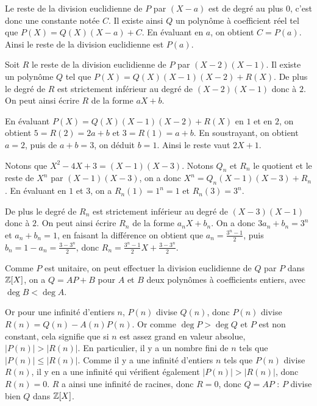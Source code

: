 \begin{sol}
Le reste de la division euclidienne de $P$ par $(X - a)$ est de degré au plus $0$, c'est donc une constante notée $C$. Il existe ainsi $Q$ un polynôme à coefficient réel tel que $P(X) = Q(X)(X - a) + C$. En évaluant en $a$, on obtient $C = P(a)$. Ainsi le reste de la division euclidienne est $P(a)$.
\end{sol}


\begin{sol}
Soit $R$ le reste de la division euclidienne de $P$ par $(X - 2)(X - 1)$. Il existe un polynôme $Q$ tel que $P(X) = Q(X)(X - 1)(X - 2) + R(X)$. De plus le degré de $R$ est strictement inférieur au degré de $(X - 2)(X - 1)$ donc à $2$. On peut ainsi écrire $R$ de la forme $aX + b$.

En évaluant $P(X) = Q(X)(X - 1)(X - 2) + R(X)$ en $1$ et en $2$, on obtient $5 = R(2) = 2a + b$ et $3 = R(1) = a + b$. En soustrayant, on obtient $a = 2$, puis de $a + b = 3$, on déduit $b = 1$. Ainsi le reste vaut $2X + 1$.
\end{sol}


\begin{sol}
Notons que $X^2 - 4X + 3 = (X - 1)(X - 3)$. Notons $Q_n$ et $R_n$ le quotient et le reste de $X^n$ par $(X - 1)(X - 3)$, on a donc $X^n = Q_n(X - 1)(X - 3) + R_n$. En évaluant en $1$ et $3$, on a $R_n(1) = 1^n = 1$ et $R_n(3) = 3^n$.

De plus le degré de $R_n$ est strictement inférieur au degré de $(X - 3)(X - 1)$ donc à $2$. On peut ainsi écrire $R_n$ de la forme $a_nX + b_n$. On a donc $3a_n + b_n = 3^n$ et $a_n + b_n = 1$, en faisant la différence on obtient que $a_n = \frac{3^n - 1}{2}$, puis $b_n = 1 - a_n = \frac{3 - 3^n}{2}$, donc $R_n = \frac{3^n - 1}{2}X + \frac{3 - 3^n}{2}$.
\end{sol}


\begin{sol}
Comme $P$ est unitaire, on peut effectuer la division euclidienne de $Q$ par $P$ dans $\mathbb Z[X]$, on a $Q = AP + B$ pour $A$ et $B$ deux polynômes à coefficients entiers, avec $\deg B<\deg A$.

Or pour une infinité d'entiers $n$, $P(n)$ divise $Q(n)$, donc $P(n)$ divise $R(n) = Q(n) - A(n)P(n)$. Or comme $\deg P > \deg Q$ et $P$ est non constant, cela signifie que si $n$ est assez grand en valeur absolue, $|P(n)|>|R(n)|$. En particulier, il y a un nombre fini de $n$ tels que $|P(n)|\le |R(n)|$. Comme il y a une infinité d'entiers $n$ tels que $P(n)$ divise $R(n)$, il y en a une infinité qui vérifient également $|P(n)|>|R(n)|$, donc $R(n) = 0$. $R$ a ainsi une infinité de racines, donc $R = 0$, donc $Q = AP$ : $P$ divise bien $Q$ dans $\mathbb Z[X]$.
\end{sol}


